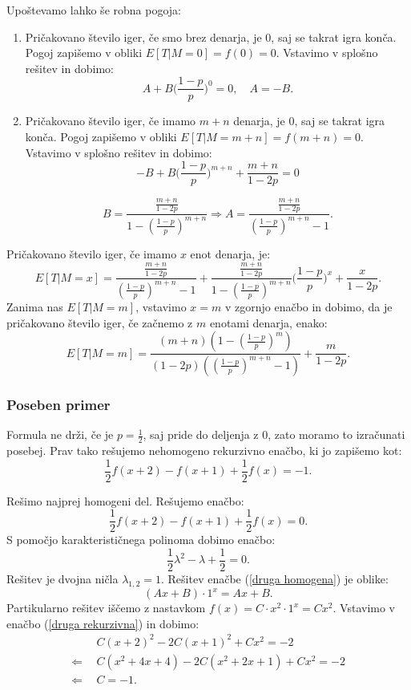 \documentclass[12pt, a4paper]{article}
\begin{document}
Upoštevamo lahko še robna pogoja:
\begin{enumerate}
\item Pričakovano število iger, če smo brez denarja, je 0, saj se takrat igra konča. Pogoj zapišemo v obliki $E[T|M= 0] = f(0) = 0$. Vstavimo v splošno rešitev in dobimo:
$$A + B\bigg( \frac{1-p}{p} \bigg )^0 = 0, \quad A = -B.$$
\item Pričakovano število iger, če imamo $m+n$ denarja, je 0, saj se takrat igra konča. Pogoj zapišemo v obliki $E[T|M= m+n] = f(m+n) = 0$. Vstavimo v splošno rešitev in dobimo:
$$-B + B\bigg( \frac{1-p}{p} \bigg )^{m+n}+\frac{m+n}{1-2p}=0$$

$$B = \frac{\frac{m+n}{1-2p}}{1- \left(\frac{1-p}{p}\right)^{m+n}} \Rightarrow A = \frac{\frac{m+n}{1-2p}}{\left(\frac{1-p}{p}\right)^{m+n}-1}.$$
\end{enumerate}

Pričakovano število iger, če imamo $x$ enot denarja, je: $$E[ T | M = x]= \frac{\frac{m+n}{1-2p}}{\left(\frac{1-p}{p}\right)^{m+n}-1} + \frac{\frac{m+n}{1-2p}}{1- \left(\frac{1-p}{p}\right)^{m+n}}\bigg( \frac{1-p}{p} \bigg )^x+\frac{x}{1-2p}.$$
 Zanima nas $E[T|M=m]$, vstavimo $x=m$ v zgornjo enačbo in dobimo, da je pričakovano število iger, če začnemo z $m$ enotami denarja, enako: $$E[T|M=m]=\frac{(m+n) \left(1-\left(\frac{1-p}{p}\right)^m\right)}{(1-2 p)
   \left(\left(\frac{1-p}{p}\right)^{m+n}-1\right)}+\frac{m}{1-2 p}.$$

\subsubsection{Poseben primer}
\label{Poseben primer za 1/2}
Formula ne drži, če je $p = \frac{1}{2}$, saj pride do deljenja z 0, zato moramo to izračunati posebej. Prav tako rešujemo nehomogeno rekurzivno enačbo, ki jo zapišemo kot: 
\begin{equation}
\label{druga rekurzivna}
\frac{1}{2}f(x+2)-f(x+1)+\frac{1}{2}f(x)=-1.
\end{equation}

Rešimo najprej homogeni del. Rešujemo enačbo: 
\begin{equation}
\label{druga homogena}
\frac{1}{2}f(x+2)-f(x+1)+\frac{1}{2}f(x)=0.
\end{equation} S pomočjo karakterističnega polinoma dobimo enačbo: 
$$\frac{1}{2}\lambda^2-\lambda+\frac{1}{2}=0.$$
Rešitev je dvojna ničla $\lambda_{1, 2}= 1$. Rešitev enačbe (\ref{druga homogena}) je oblike: $$(Ax+B)\cdot 1^x=Ax+B.$$
Partikularno rešitev iščemo z nastavkom $f(x)=C\cdot x^2\cdot 1^x= Cx^2$. Vstavimo v enačbo (\ref{druga rekurzivna}) in dobimo:
\begin{equation*}
\begin{split}
 & ~~C(x+2)^2-2C(x+1)^2+Cx^2=-2\\
\Leftarrow & ~~C(x^2+4x+4)-2C(x^2+2x+1)+Cx^2=-2\\
\Leftarrow &  ~~C = -1 .\\
\end{split}
\end{equation*}
\end{document}
